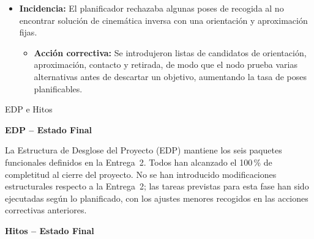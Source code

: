 \documentclass[12pt,a4paper]{article}
\makeatletter
\newcommand{\subsecfmt}[1]{%
  {\large\bfseries\color{MediumBlue}#1}%
  \par\vspace{2pt}%
}
\renewcommand\subsection{%
  \@ifstar\subsection@star\subsection@nostar
}
\newcommand\subsection@nostar[1]{%
  \refstepcounter{subsection}%
  \addcontentsline{toc}{subsection}{\protect\numberline{\thesubsection}#1}%
  \vspace{10pt}%
  \subsecfmt{\thesubsection.\enspace #1}%
  \vspace{2pt}%
}
\newcommand\subsection@star[1]{%
  \vspace{10pt}\subsecfmt{#1}\vspace{2pt}%
}
\makeatother
\begin{document}
\begin{itemize}
  \vspace{9.2pt}
  \begin{itemize}
    \item \textbf{Acción correctiva:} Se ampliaron los \textit{timeouts} críticos del ciclo: el de
          \texttt{/compute\_ik} se elevó a 2{,}0~s y se holgaron los tiempos de aproximación, descarga,
          movimiento y retirada hacia las cajas, eliminando los fallos por tiempo agotado.
  \end{itemize}
  \vspace{15.5pt}
  \item \textbf{Incidencia:} El planificador rechazaba algunas poses de recogida al no encontrar
        solución de cinemática inversa con una orientación y aproximación fijas.
  \vspace{9.2pt}
  \begin{itemize}
    \item \textbf{Acción correctiva:} Se introdujeron listas de candidatos de orientación, aproximación,
          contacto y retirada, de modo que el nodo prueba varias alternativas antes de descartar un
          objetivo, aumentando la tasa de poses planificables.
  \end{itemize}
\end{itemize}
\clearpage
\subsection{EDP e Hitos}

\vspace{4pt}
{\bfseries\color{MediumBlue}\large EDP -- Estado Final}
\vspace{4pt}\par

La Estructura de Desglose del Proyecto (EDP) mantiene los seis paquetes funcionales definidos en la
Entrega~2. Todos han alcanzado el 100\,\% de completitud al cierre del proyecto. No se han introducido
modificaciones estructurales respecto a la Entrega~2; las tareas previstas para esta fase han sido
ejecutadas según lo planificado, con los ajustes menores recogidos en las acciones correctivas anteriores.

\vspace{14pt}
{\bfseries\color{MediumBlue}\large Hitos -- Estado Final}
\end{document}
